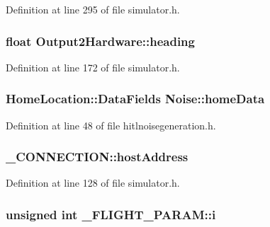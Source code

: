 \-Definition at line 295 of file simulator.\-h.

\hypertarget{group___h_i_t_l_plugin_ga061c55e7f046212595dae9123b2589d8}{
\subsubsection[{heading}]{\setlength{\rightskip}{0pt plus 5cm}float {\bf \-Output2\-Hardware\-::heading}}}\label{group___h_i_t_l_plugin_ga061c55e7f046212595dae9123b2589d8}


\-Definition at line 172 of file simulator.\-h.

\hypertarget{group___h_i_t_l_plugin_ga3138fe65ade5af4ff6ff614c0956fc0a}{
\subsubsection[{home\-Data}]{\setlength{\rightskip}{0pt plus 5cm}\-Home\-Location\-::\-Data\-Fields {\bf \-Noise\-::home\-Data}}}\label{group___h_i_t_l_plugin_ga3138fe65ade5af4ff6ff614c0956fc0a}


\-Definition at line 48 of file hitlnoisegeneration.\-h.

\hypertarget{group___h_i_t_l_plugin_ga21da3bd31909fdf7fd5116c2a91a1176}{
\subsubsection[{host\-Address}]{ {\bf \-\_\-\-C\-O\-N\-N\-E\-C\-T\-I\-O\-N\-::host\-Address}}}\label{group___h_i_t_l_plugin_ga21da3bd31909fdf7fd5116c2a91a1176}


\-Definition at line 128 of file simulator.\-h.

\hypertarget{group___h_i_t_l_plugin_gafd95bf6c88f8e93baff6c5e27a5508a4}{
\subsubsection[{i}]{\setlength{\rightskip}{0pt plus 5cm}unsigned int {\bf \-\_\-\-F\-L\-I\-G\-H\-T\-\_\-\-P\-A\-R\-A\-M\-::i}}}\label{group___h_i_t_l_plugin_gafd95bf6c88f8e93baff6c5e27a5508a4}


